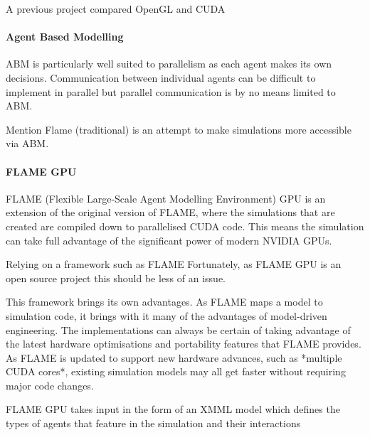 \documentclass{UoYCSproject}
\begin{document}
A previous project compared OpenGL and CUDA


\paragraph{Agent Based Modelling}

ABM is particularly well suited to parallelism as each agent makes its own decisions.
Communication between individual agents can be difficult to implement in parallel but parallel communication is by no means limited to ABM.


Mention Flame (traditional) is an attempt to make simulations more accessible via ABM.

\paragraph{FLAME GPU}

FLAME (Flexible Large-Scale Agent Modelling Environment) GPU is an extension of the original version of FLAME, where the simulations that are created are compiled down to parallelised CUDA code. This means the simulation can take full advantage of the significant power of modern NVIDIA GPUs.

Relying on a framework such as FLAME
Fortunately, as FLAME GPU is an open source project this should be less of an issue.

This framework brings its own advantages. As FLAME maps a model to simulation code, it brings with it many of the advantages of model-driven engineering.
The implementations can always be certain of taking advantage of the latest hardware optimisations and portability features that FLAME provides.
As FLAME is updated to support new hardware advances, such as *multiple CUDA cores*, existing simulation models may all get faster without requiring major code changes.


FLAME GPU takes input in the form of an XMML model which defines the types of agents that feature in the simulation and their interactions%
\end{document}
